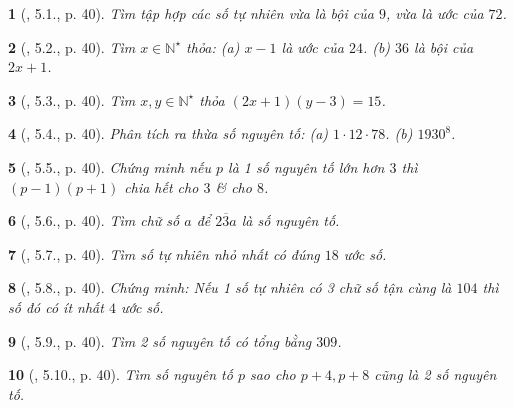 \documentclass{article}
\newtheorem{baitoan}{}
\begin{document}
\begin{baitoan}[\cite{Binh_boi_duong_Toan_6_tap_1}, 5.1., p. 40]
	Tìm tập hợp các số tự nhiên vừa là bội của $9$, vừa là ước của $72$.
\end{baitoan}

\begin{baitoan}[\cite{Binh_boi_duong_Toan_6_tap_1}, 5.2., p. 40]
	Tìm $x\in\mathbb{N}^\star$ thỏa: (a) $x - 1$ là ước của $24$. (b) $36$ là bội của $2x + 1$.
\end{baitoan}

\begin{baitoan}[\cite{Binh_boi_duong_Toan_6_tap_1}, 5.3., p. 40]
	Tìm $x,y\in\mathbb{N}^\star$ thỏa $(2x + 1)(y - 3) = 15$.
\end{baitoan}

\begin{baitoan}[\cite{Binh_boi_duong_Toan_6_tap_1}, 5.4., p. 40]
	Phân tích ra thừa số nguyên tố: (a) $1\cdot12\cdot78$. (b) $1930^8$.
\end{baitoan}

\begin{baitoan}[\cite{Binh_boi_duong_Toan_6_tap_1}, 5.5., p. 40]
	Chứng minh nếu $p$ là 1 số nguyên tố lớn hơn $3$ thì $(p - 1)(p + 1)$ chia hết cho $3$ \& cho $8$.
\end{baitoan}

\begin{baitoan}[\cite{Binh_boi_duong_Toan_6_tap_1}, 5.6., p. 40]
	Tìm chữ số $a$ để $\overline{23a}$ là số nguyên tố.
\end{baitoan}

\begin{baitoan}[\cite{Binh_boi_duong_Toan_6_tap_1}, 5.7., p. 40]
	Tìm số tự nhiên nhỏ nhất có đúng $18$ ước số.
\end{baitoan}

\begin{baitoan}[\cite{Binh_boi_duong_Toan_6_tap_1}, 5.8., p. 40]
	Chứng minh: Nếu 1 số tự nhiên có 3 chữ số tận cùng là $104$ thì số đó có ít nhất $4$ ước số.
\end{baitoan}

\begin{baitoan}[\cite{Binh_boi_duong_Toan_6_tap_1}, 5.9., p. 40]
	Tìm 2 số nguyên tố có tổng bằng $309$.
\end{baitoan}

\begin{baitoan}[\cite{Binh_boi_duong_Toan_6_tap_1}, 5.10., p. 40]
	Tìm số nguyên tố $p$ sao cho $p + 4,p + 8$ cũng là 2 số nguyên tố.
\end{baitoan}
\end{document}
